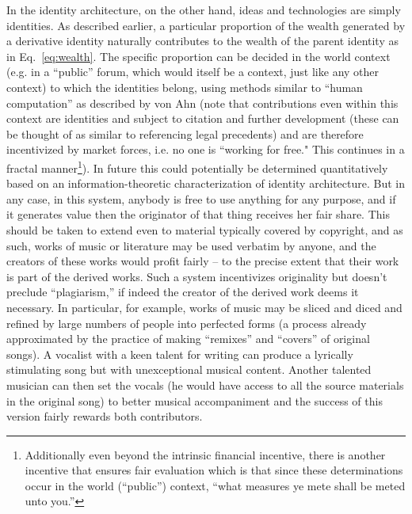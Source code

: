 \documentclass[pra,twocolumn,groupedaddress,10pt]{revtex4}
\theoremstyle{definition}
\begin{document}
In the identity architecture, on the other hand, ideas and technologies are simply identities. As described earlier, a particular proportion of the wealth generated by a derivative identity naturally contributes to the wealth of the parent identity as in Eq.~\ref{eq:wealth}. The specific proportion can be decided in the world context (e.g. in a ``public'' forum, which would itself be a context, just like any other context) to which the identities belong, using methods similar to ``human computation'' as described by von Ahn\cite{vonahn} (note that contributions even within this context are identities and subject to citation and further development (these can be thought of as similar to referencing legal precedents) and are therefore incentivized by market forces, i.e. no one is ``working for free." This continues in a fractal manner\footnote{Additionally even beyond the intrinsic financial incentive, there is another incentive that ensures fair evaluation which is that since these determinations occur in the world (``public'') context, ``what measures ye mete shall be meted unto you.''}). In future this could potentially be determined quantitatively based on an information-theoretic characterization of identity architecture. But in any case, in this system, anybody is free to use anything for any purpose, and if it generates value then the originator of that thing receives her fair share. This should be taken to extend even to material typically covered by copyright, and as such, works of music or literature may be used verbatim by anyone, and the creators of these works would profit fairly -- to the precise extent that their work is part of the derived works. Such a system incentivizes originality but doesn't preclude ``plagiarism,'' if indeed the creator of the derived work deems it necessary. In particular, for example, works of music may be sliced and diced and refined by large numbers of people into perfected forms (a process already approximated by the practice of making ``remixes'' and ``covers'' of original songs). A vocalist with a keen talent for writing can produce a lyrically stimulating song but with unexceptional musical content. Another talented musician can then set the vocals (he would have access to all the source materials in the original song) to better musical accompaniment and the success of this version fairly rewards both contributors.
\end{document}
